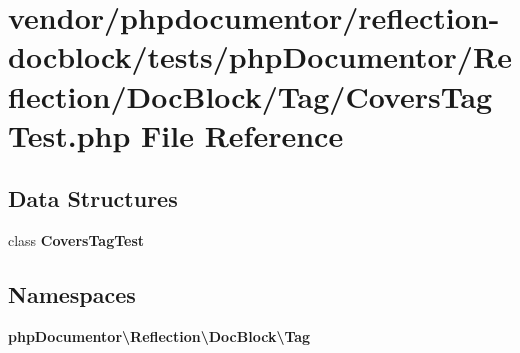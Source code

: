 \section{vendor/phpdocumentor/reflection-\/docblock/tests/php\+Documentor/\+Reflection/\+Doc\+Block/\+Tag/\+Covers\+Tag\+Test.php File Reference}
\label{_covers_tag_test_8php}
\subsection*{Data Structures}
\begin{DoxyCompactItemize}
\item 
class {\bf Covers\+Tag\+Test}
\end{DoxyCompactItemize}
\subsection*{Namespaces}
\begin{DoxyCompactItemize}
\item 
 {\bf php\+Documentor\textbackslash{}\+Reflection\textbackslash{}\+Doc\+Block\textbackslash{}\+Tag}
\end{DoxyCompactItemize}
